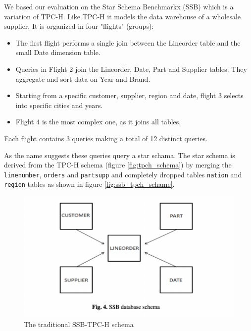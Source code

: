 We based our evaluation on the Star Schema Benchmarkx (SSB)
\cite{barataOverviewDecisionSupport2015} which is a variation of
TPC-H. Like TPC-H it models the data warehouse of a wholesale
supplier. It is organized in four "flights" (groups):

\begin{itemize}
\item The first flight performs a single join between the Lineorder table
and the small Date dimension table.
\item Queries in Flight 2 join the Lineorder, Date, Part and Supplier
tables. They aggregate and sort data on Year and Brand.
\item Starting from a specific customer, supplier, region and date, flight
3 selects into specific cities and years.
\item Flight 4 is the most complex one, as it joins all tables.
\end{itemize}

Each flight contains 3 queries making a total of 12 distinct queries.

As the name suggests these queries query a star schama. The star
schema is derived from the TPC-H schema (figure \ref{fig:tpch_schema})
by merging the \texttt{linenumber}, \texttt{orders} and
\texttt{partsupp} and completely dropped tables \texttt{nation} and
\texttt{region} tables as shown in figure \ref{fig:ssb_tpch_schame}.

\begin{figure}[p]
\centering
\includegraphics[width=.9\linewidth]{./imgs/2021-11-15_23-36-57_screenshot.png}
\caption{The traditional SSB-TPC-H schema}
\label{fig:ssb_tpch_schema}
\end{figure}


